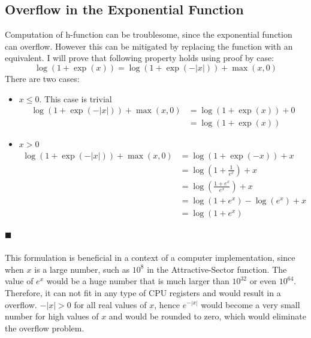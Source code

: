 \documentclass[a4paper]{article}
\newcommand*{\QEDA}{\hfill\ensuremath{\blacksquare}}%
\begin{document}
\subsection{Overflow in the Exponential Function}
Computation of h-function can be troublesome, since the exponential function can
overflow. However this can be mitigated by replacing the function with an equivalent.
I will prove that following property holds using proof by case:
\[
\log (1+\exp (x))=\log (1+\exp (-|x|))+\max (x, 0)
\]
There are two cases:
\begin{itemize}
\item $x \leq 0$. This case is trivial
  \begin{align*}
    \log (1+\exp (-|x|))+\max (x, 0) &= \log (1+\exp (x)) + 0\\
    &= \log (1+\exp(x))
  \end{align*}
\item $x > 0$
  \begin{align*}
    \log (1+\exp (-|x|))+\max (x, 0) &= \log (1+\exp (-x)) + x\\
    &=\log \left(1 + \frac{1}{e^{x}}\right) + x\\
    &=\log \left(\frac{1 + e^{x}}{e^{x}}\right) + x\\
    &=\log (1 + e^{x}) - \log \left(e^{x}\right) + x\\
    &=\log (1 + e^{x})
  \end{align*}
\end{itemize}
\QEDA\\\\
This formulation is beneficial in a context of a computer implementation, since
when $x$ is a large number, such as $10^8$ in the Attractive-Sector function.
The value of $e^{x}$ would be a huge number that is much larger than
$10^{32}$ or even $10^{64}$. Therefore, it can not fit in any type of CPU
registers and would result in a overflow. $-|x| > 0$ for all real values of $x$,
hence $e^{-|x|}$ would become a very small number for high values of $x$ and
would be rounded to zero, which would eliminate the overflow problem.



\end{document}
